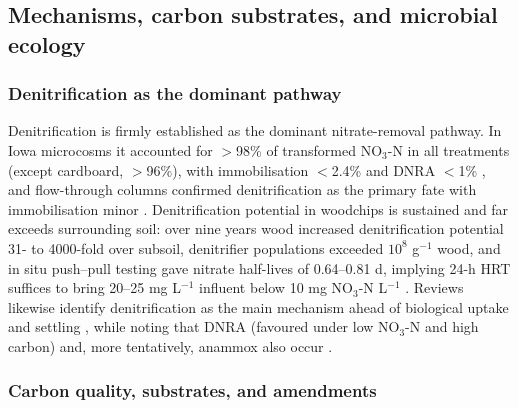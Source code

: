 \documentclass[11pt]{article}
\begin{document}
\subsection{Mechanisms, carbon substrates, and microbial ecology}

\subsubsection{Denitrification as the dominant pathway}

Denitrification is firmly established as the dominant nitrate-removal pathway. In Iowa microcosms it accounted for $>$98\% of transformed NO$_3$-N in all treatments (except cardboard, $>$96\%), with immobilisation $<$2.4\% and DNRA $<$1\% \parencite{Greenan2006}, and flow-through columns confirmed denitrification as the primary fate with immobilisation minor \parencite{Greenan2009}. Denitrification potential in woodchips is sustained and far exceeds surrounding soil: over nine years wood increased denitrification potential 31- to 4000-fold over subsoil, denitrifier populations exceeded $10^8$ g$^{-1}$ wood, and in situ push--pull testing gave nitrate half-lives of 0.64--0.81 d, implying 24-h HRT suffices to bring 20--25 mg L$^{-1}$ influent below 10 mg NO$_3$-N L$^{-1}$ \parencite{Moorman2010}. Reviews likewise identify denitrification as the main mechanism ahead of biological uptake and settling \parencite{Mendes2021}, while noting that DNRA (favoured under low NO$_3$-N and high carbon) and, more tentatively, anammox also occur \parencite{Hartfiel2022}.

\subsubsection{Carbon quality, substrates, and amendments}
\end{document}

